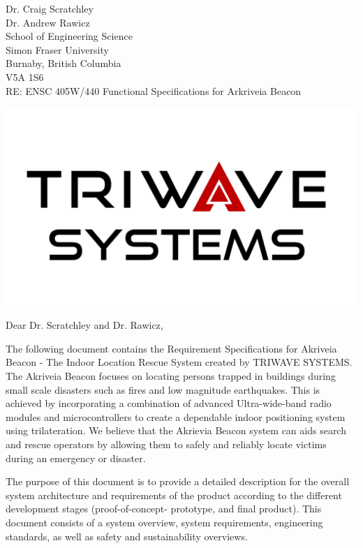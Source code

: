 \documentclass[11pt]{letter}
\date{June 09, 2019}
\begin{document}
\begin{letter}{
Dr. Craig Scratchley\\
Dr. Andrew Rawicz\\
School of Engineering Science\\
Simon Fraser University\\
Burnaby, British Columbia\\
V5A 1S6\\
\bigskip
RE: ENSC 405W/440 Functional Specifications for Arkriveia Beacon\\
}


\begin{center}
\includegraphics[scale=0.25]{./images/logo_W.png}
\end{center}


\opening{Dear Dr. Scratchley and Dr. Rawicz,}

\medskip
The following document contains the Requirement Specifications for Akriveia Beacon - The Indoor Location Rescue System created by TRIWAVE SYSTEMS. The Akriveia Beacon focuses on locating persons trapped in buildings during small scale disasters such as fires and low magnitude earthquakes. This is achieved by incorporating a combination of advanced Ultra-wide-band radio modules and microcontrollers to create a dependable indoor positioning system using trilateration. We believe that the Akrievia Beacon system can aids search and rescue operators by allowing them to safely and reliably locate victims during an emergency or disaster.

\medskip
The purpose of this document is to provide a detailed description for the overall system architecture and requirements of the product according to the different development stages (proof-of-concept- prototype, and final product). This document consists of a system overview, system requirements, engineering standards, as well as safety and sustainability overviews.


\end{letter}
\end{document}
